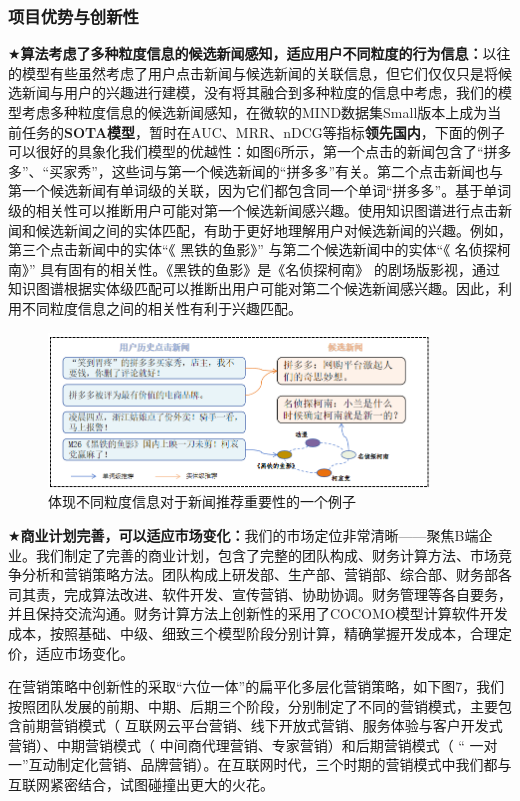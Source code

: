 \documentclass[withoutpreface,bwprint]{cumcmthesis} %
\begin{document}
	\subsubsection{ 项目优势与创新性}
	$\bigstar$\textbf{算法考虑了多种粒度信息的候选新闻感知，适应用户不同粒度的行为信息：}以往的模型有些虽然考虑了用户点击新闻与候选新闻的关联信息，但它们仅仅只是将候选新闻与用户的兴趣进行建模，没有将其融合到多种粒度的信息中考虑，我们的模型考虑多种粒度信息的候选新闻感知，在微软的MIND数据集Small版本上成为当前任务的\textbf{SOTA模型}，暂时在AUC、MRR、nDCG等指标\textbf{领先国内}，下面的例子可以很好的具象化我们模型的优越性：如图6所示，第一个点击的新闻包含了“拼多多”、“买家秀”，这些词与第一个候选新闻的“拼多多”有关。第二个点击新闻也与第一个候选新闻有单词级的关联，因为它们都包含同一个单词“拼多多”。基于单词级的相关性可以推断用户可能对第一个候选新闻感兴趣。使用知识图谱进行点击新闻和候选新闻之间的实体匹配，有助于更好地理解用户对候选新闻的兴趣。例如，第三个点击新闻中的实体“《 黑铁的鱼影》” 与第二个候选新闻中的实体“《 名侦探柯南》” 具有固有的相关性。《黑铁的鱼影》是《名侦探柯南》 的剧场版影视，通过知识图谱根据实体级匹配可以推断出用户可能对第二个候选新闻感兴趣。因此，利用不同粒度信息之间的相关性有利于兴趣匹配。\par
	\begin{figure}[H]
		\centering
		\includegraphics[width=0.9\textwidth]{sample}
		\caption{体现不同粒度信息对于新闻推荐重要性的一个例子}
		\label{fig:circuit-diagcam}
	\end{figure}
	$\bigstar$\textbf{商业计划完善，可以适应市场变化：}我们的市场定位非常清晰——聚焦B端企业。我们制定了完善的商业计划，包含了完整的团队构成、财务计算方法、市场竞争分析和营销策略方法。团队构成上研发部、生产部、营销部、综合部、财务部各司其责，完成算法改进、软件开发、宣传营销、协助协调。财务管理等各自要务，并且保持交流沟通。财务计算方法上创新性的采用了COCOMO模型计算软件开发成本，按照基础、中级、细致三个模型阶段分别计算，精确掌握开发成本，合理定价，适应市场变化。\par
	在营销策略中创新性的采取“六位一体”的扁平化多层化营销策略，如下图7，我们按照团队发展的前期、中期、后期三个阶段，分别制定了不同的营销模式，主要包含前期营销模式（ 互联网云平台营销、线下开放式营销、服务体验与客户开发式营销）、中期营销模式（ 中间商代理营销、专家营销）和后期营销模式（ “ 一对一”互动制定化营销、品牌营销）。在互联网时代，三个时期的营销模式中我们都与互联网紧密结合，试图碰撞出更大的火花。\par
\end{document}
